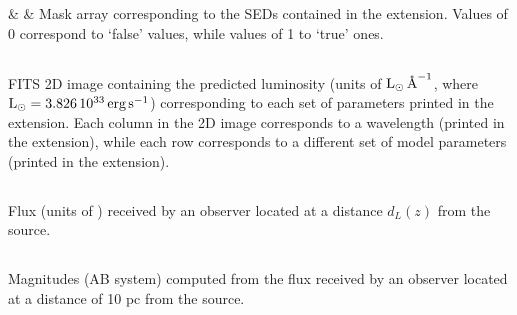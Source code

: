 \documentclass[a4paper,11pt,twoside]{article}
\begin{document}
\begin{fits_table}

    &   & Mask array corresponding to the SEDs contained in the  extension. Values of 0 correspond to `false' values, while values of 1 to `true' ones.\\

\end{fits_table}



\subsection{}

FITS 2D image containing the predicted luminosity (units of $\hbox{$\textnormal{L}_{\odot}$}\, \textnormal{\AA}^{-1}$, where $\hbox{$\textnormal{L}_{\odot}$} = 3.826 \, 10^{33} \, \textnormal{erg} \,\textnormal{s}^{-1}$) corresponding to each set of parameters printed in the  extension. Each column in the 2D image corresponds to a wavelength (printed in the  extension), while each row corresponds to a different set of model parameters (printed in the  extension). 



\subsection{}

Flux (units of \FnuUnits) received by an observer located at a distance $d_L(z)$ from the source. 


\subsection{}

Magnitudes (AB system) computed from the flux received by an observer located at a distance of 10 pc from the source.


\subsection{}
\end{document}
